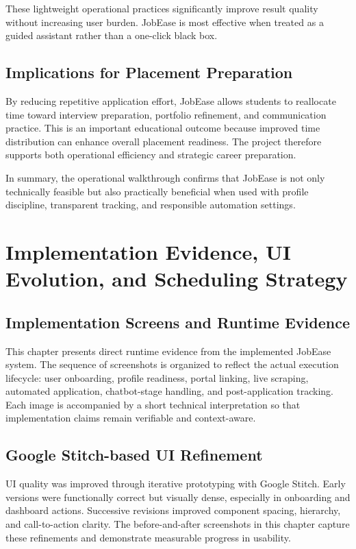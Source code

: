 \documentclass[12pt,a4paper,oneside]{report}
\begin{document}
These lightweight operational practices significantly improve result quality without increasing user burden. JobEase is most effective when treated as a guided assistant rather than a one-click black box.

\section{Implications for Placement Preparation}
By reducing repetitive application effort, JobEase allows students to reallocate time toward interview preparation, portfolio refinement, and communication practice. This is an important educational outcome because improved time distribution can enhance overall placement readiness. The project therefore supports both operational efficiency and strategic career preparation.

In summary, the operational walkthrough confirms that JobEase is not only technically feasible but also practically beneficial when used with profile discipline, transparent tracking, and responsible automation settings.

\chapter{Implementation Evidence, UI Evolution, and Scheduling Strategy}
\section{Implementation Screens and Runtime Evidence}
This chapter presents direct runtime evidence from the implemented JobEase system. The sequence of screenshots is organized to reflect the actual execution lifecycle: user onboarding, profile readiness, portal linking, live scraping, automated application, chatbot-stage handling, and post-application tracking. Each image is accompanied by a short technical interpretation so that implementation claims remain verifiable and context-aware.

\section{Google Stitch-based UI Refinement}
UI quality was improved through iterative prototyping with Google Stitch. Early versions were functionally correct but visually dense, especially in onboarding and dashboard actions. Successive revisions improved component spacing, hierarchy, and call-to-action clarity. The before-and-after screenshots in this chapter capture these refinements and demonstrate measurable progress in usability.
\end{document}
